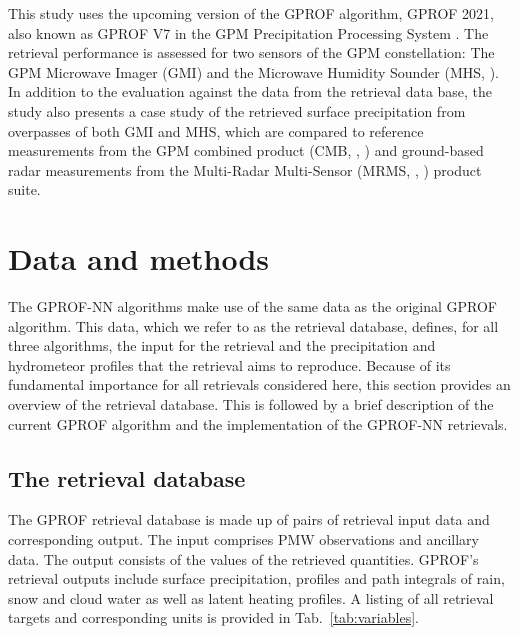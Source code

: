 \documentclass[journal abbreviation, manuscript]{copernicus}
\begin{document}
This study uses the upcoming version of the GPROF algorithm, GPROF 2021, also
known as GPROF V7 in the GPM Precipitation Processing System \citep{pps}. The
retrieval performance is assessed for two sensors of the GPM constellation: The
GPM Microwave Imager (GMI) and the Microwave Humidity Sounder (MHS,
\citet{bonsignori07}). In addition to the evaluation against the data from the
retrieval data base, the study also presents a case study of the retrieved
surface precipitation from overpasses of both GMI and MHS, which are compared to
reference measurements from the GPM combined product (CMB, \citeauthor{grecu16},
\citeyear{grecu16}) and ground-based radar measurements from the Multi-Radar
Multi-Sensor (MRMS, \citeauthor{smith16}, \citeyear{smith16}) product suite.

\section{Data and methods}

The GPROF-NN algorithms make use of the same data as the original GPROF
algorithm. This data, which we refer to as the retrieval database, defines, for
all three algorithms, the input for the retrieval and the precipitation and
hydrometeor profiles that the retrieval aims to reproduce. Because of its
fundamental importance for all retrievals considered here, this section provides
an overview of the retrieval database. This is followed by a brief description
of the current GPROF algorithm and the implementation of the GPROF-NN
retrievals.

\subsection{The retrieval database}

The GPROF retrieval database is made up of pairs of retrieval input data and
corresponding output. The input comprises PMW observations and
ancillary data. The output consists of the values of the retrieved quantities.
GPROF's retrieval outputs include surface precipitation, profiles and path
integrals of rain, snow and cloud water as well as latent heating profiles. A
listing of all retrieval targets and corresponding units is provided in
Tab.~\ref{tab:variables}.
\end{document}
